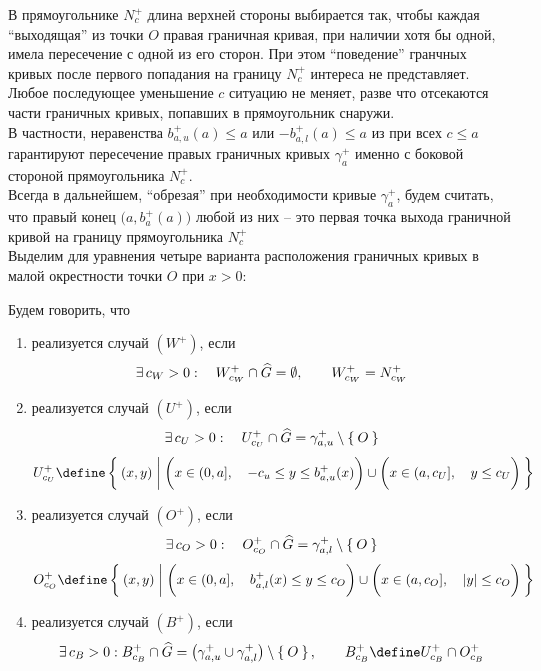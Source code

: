 В прямоугольнике $ N_c^+ $ длина верхней стороны выбирается так, чтобы каждая ``выходящая'' из точки $ O $ правая граничная кривая, при наличии хотя бы одной, имела пересечение с одной из его сторон. При этом ``поведение'' гранчных кривых после первого попадания на границу $ N_c^+ $ интереса не представляет. \\
Любое последующее уменьшение $ c $ ситуацию не меняет, разве что отсекаются части граничных кривых, попавших в прямоугольник снаружи. \\
В частности, неравенства $ b_{a, u}^+(a) \le a $ или $ -b_{a, l}^+(a) \le a $ из  при всех $ c \le a $ гарантируют пересечение правых граничных кривых $ \gamma_a^+ $ именно с боковой стороной прямоугольника $ N_c^+ $. \\
Всегда в дальнейшем, ``обрезая'' при необходимости кривые $ \gamma_a^+ $, будем считать, что правый конец $ \big( a, b_a^+(a) \big) $ любой из них -- это первая точка выхода граничной кривой на границу прямоугольника $ N_c^+ $ \\
Выделим для уравнения  четыре варианта расположения граничных кривых в малой окрестности точки $ O $ при $ x > 0 $:
\begin{definition}
	Будем говорить, что
    \begin{enumerate}
        \item реализуется случай $ (W^+) $, если
        $$ \exists\, c_W > 0 : \quad W_{c_W}^+ \cap \widehat{G} = \emptyset, \qquad W_{c_W}^+ = N_{c_W}^+ $$
        \item реализуется случай $ (U^+) $, если
        $$ \exists\, c_U > 0 : \quad U_{c_U}^+ \cap \widehat{G} = \gamma_{a, u}^+ \setminus \Set{O} $$
        $$ U_{c_U}^+ \define \set{(x, y) | \bigg( x \in (0, a], \quad -c_u \le y \le b_{a, u}^+(x) \bigg) \cup \bigg( x \in (a, c_U], \quad y \le c_U \bigg)} $$
        \item реализуется случай $ (O^+) $, если
        $$ \exists\, c_O > 0 : \quad O_{c_O}^+ \cap \widehat{G} = \gamma_{a, l}^+ \setminus \Set{O} $$
        $$ O_{c_O}^+ \define \set{(x, y) | \bigg( x \in (0, a], \quad b_{a, l}^+(x) \le y \le c_O \bigg) \cup \bigg( x \in (a, c_O], \quad |y| \le c_O \bigg)} $$
        \item реализуется случай $ (B^+) $, если
        $$ \exist c_B > 0 : B_{c_B}^+ \cap \hat{G} = \big( \gamma_{a, u}^+ \cup \gamma_{a, l}^+ \big) \setminus \set{O}, \qquad B_{c_B}^+ \define U_{c_B}^+ \cap O_{c_B}^+ $$
    \end{enumerate}
\end{definition}

